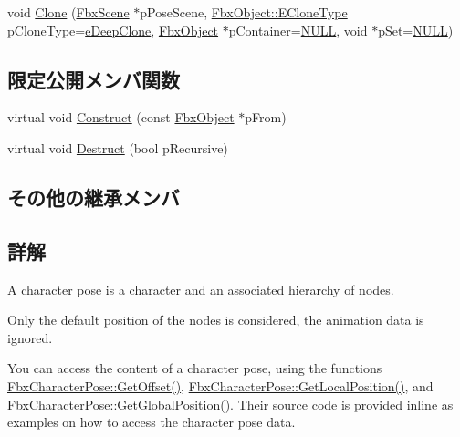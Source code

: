 \begin{DoxyCompactItemize}
\item 
void \hyperlink{class_fbx_character_pose_ac7f229efcac9268afb0e37540a29a08d}{Clone} (\hyperlink{class_fbx_scene}{Fbx\+Scene} $\ast$p\+Pose\+Scene, \hyperlink{class_fbx_object_a9f5626b2d2135684d6ea1e6e4ad2acbb}{Fbx\+Object\+::\+E\+Clone\+Type} p\+Clone\+Type=\hyperlink{class_fbx_object_a9f5626b2d2135684d6ea1e6e4ad2acbbaacdf137ca059c572798287e98c4236d0}{e\+Deep\+Clone}, \hyperlink{class_fbx_object}{Fbx\+Object} $\ast$p\+Container=\hyperlink{fbxarch_8h_a070d2ce7b6bb7e5c05602aa8c308d0c4}{N\+U\+LL}, void $\ast$p\+Set=\hyperlink{fbxarch_8h_a070d2ce7b6bb7e5c05602aa8c308d0c4}{N\+U\+LL})
\end{DoxyCompactItemize}
\subsection*{限定公開メンバ関数}
\begin{DoxyCompactItemize}
\item 
virtual void \hyperlink{class_fbx_character_pose_a9da449d510900348679190d90deb5a8a}{Construct} (const \hyperlink{class_fbx_object}{Fbx\+Object} $\ast$p\+From)
\item 
virtual void \hyperlink{class_fbx_character_pose_a81243ac4049bf44a94dcfee8639a03f0}{Destruct} (bool p\+Recursive)
\end{DoxyCompactItemize}
\subsection*{その他の継承メンバ}


\subsection{詳解}
A character pose is a character and an associated hierarchy of nodes. 

Only the default position of the nodes is considered, the animation data is ignored.

You can access the content of a character pose, using the functions \hyperlink{class_fbx_character_pose_a0abc45efdccf78de0b736232bb85e106}{Fbx\+Character\+Pose\+::\+Get\+Offset()}, \hyperlink{class_fbx_character_pose_ab258febbc8198b6687eaef43654909c5}{Fbx\+Character\+Pose\+::\+Get\+Local\+Position()}, and \hyperlink{class_fbx_character_pose_abe05a6239a8a3e436a3e4d28ccde5499}{Fbx\+Character\+Pose\+::\+Get\+Global\+Position()}. Their source code is provided inline as examples on how to access the character pose data.

